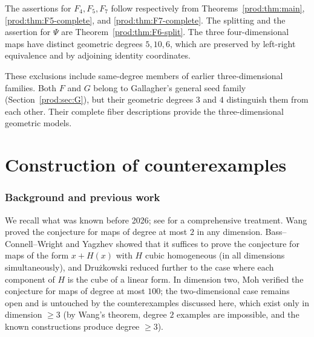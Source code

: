 \documentclass[11pt]{article}
\numberwithin{equation}{section}
\theoremstyle{plain}
\theoremstyle{definition}
\theoremstyle{remark}
\begin{document}
The assertions for $F_4,F_5,F_7$ follow respectively from
Theorems~\ref{prod:thm:main}, \ref{prod:thm:F5-complete}, and
\ref{prod:thm:F7-complete}. The splitting and the assertion for $\Psi$
are Theorem~\ref{prod:thm:F6-split}. The three four-dimensional maps
have distinct geometric degrees $5,10,6$, which are preserved by
left-right equivalence and by adjoining identity coordinates.

These exclusions include same-degree members of earlier three-dimensional
families. Both $F$ and $G$ belong to Gallagher's general seed family
(Section~\ref{prod:sec:G}), but their geometric degrees $3$ and $4$
distinguish them from each other. Their complete fiber descriptions
provide the three-dimensional geometric models.

\clearpage
\part{Construction of counterexamples}\label{part:construction}

\section{Background and previous work}\label{sec:background}

We recall what was known before 2026; see \cite{Essen2000} for a comprehensive
treatment. Wang \cite{Wang1980} proved the conjecture for maps of degree at most
$2$ in any dimension. Bass--Connell--Wright \cite{BCW1982} and Yagzhev
\cite{Yagzhev1980} showed that it suffices to prove the conjecture for maps of the
form $x+H(x)$ with $H$ cubic homogeneous (in all dimensions simultaneously), and
Dru\.zkowski \cite{Druzkowski1983} reduced further to the case where each
component of $H$ is the cube of a linear form. In dimension two, Moh
\cite{Moh1983} verified the conjecture for maps of degree at most $100$; the
two-dimensional case remains open and is untouched by the counterexamples
discussed here, which exist only in dimension $\ge3$ (by Wang's theorem, degree
$2$ examples are impossible, and the known constructions produce degree $\ge3$).
\end{document}

